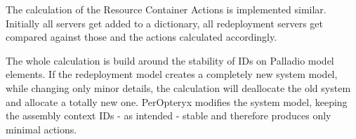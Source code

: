 The calculation of the Resource Container Actions is implemented similar. Initially all servers get added to a dictionary, all redeployment servers get compared against those and the actions calculated accordingly.

The whole calculation is build around the stability of IDs on Palladio model elements. If the redeployment model creates a completely new system model, while changing only minor details, the calculation will deallocate the old system and allocate a totally new one. PerOpteryx modifies the system model, keeping the assembly context IDs - as intended - stable and therefore produces only minimal actions.


